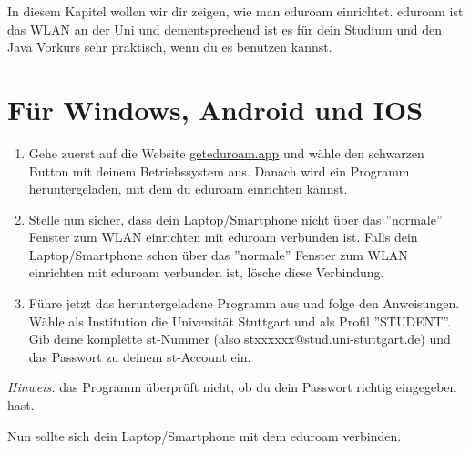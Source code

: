 
\label{ex1}

In diesem Kapitel wollen wir dir zeigen, wie man eduroam einrichtet. eduroam ist das WLAN an der Uni und dementsprechend ist es für dein Studium und den Java Vorkurs sehr praktisch, wenn du es benutzen kannst.
 
\section*{Für Windows, Android und IOS}
\begin{enumerate}[label=\arabic*.]
    \item Gehe zuerst auf die Website \href{\eduroamurl}{geteduroam.app} und wähle den schwarzen Button mit deinem Betriebssystem aus. Danach wird ein Programm heruntergeladen, mit dem du eduroam einrichten kannst.
    \item Stelle nun sicher, dass dein Laptop/Smartphone nicht über das ''normale'' Fenster zum WLAN einrichten mit eduroam verbunden ist. Falls dein Laptop/Smartphone schon über das ''normale'' Fenster zum WLAN einrichten mit eduroam verbunden ist, lösche diese Verbindung.
    \item Führe jetzt das heruntergeladene Programm aus und folge den Anweisungen. Wähle als Institution die Universität Stuttgart und als Profil ''STUDENT''. Gib deine komplette st-Nummer (also stxxxxxx@stud.uni-stuttgart.de) und das Passwort zu deinem st-Account ein.
\end{enumerate}

\textit{Hinweis:} das Programm überprüft nicht, ob du dein Passwort richtig eingegeben hast.

Nun sollte sich dein Laptop/Smartphone mit dem eduroam verbinden.



